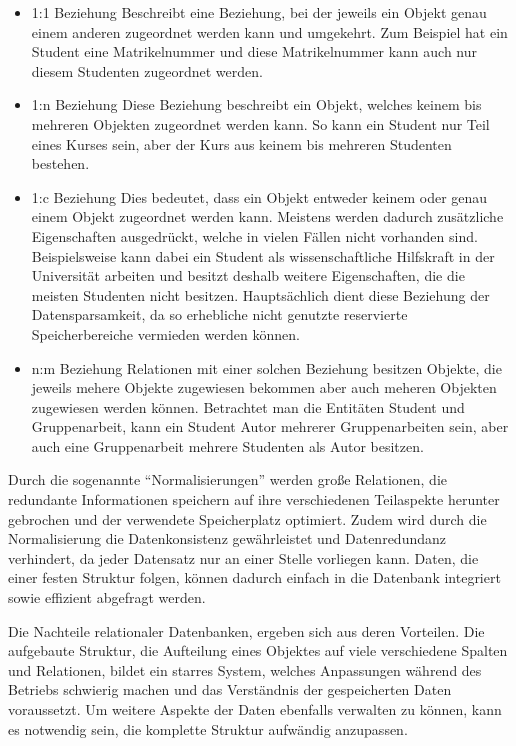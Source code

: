 \begin{itemize}
    \item 1:1 Beziehung \newline
    Beschreibt eine Beziehung, bei der jeweils ein Objekt genau einem anderen zugeordnet werden kann und umgekehrt.
    Zum Beispiel hat ein Student eine Matrikelnummer und diese Matrikelnummer kann auch nur diesem Studenten zugeordnet werden.
    \item 1:n Beziehung \newline
    Diese Beziehung beschreibt ein Objekt, welches keinem bis mehreren Objekten zugeordnet werden kann.
    So kann ein Student nur Teil eines Kurses sein, aber der Kurs aus keinem bis mehreren Studenten bestehen.
    \item 1:c Beziehung \newline
    Dies bedeutet, dass ein Objekt entweder keinem oder genau einem Objekt zugeordnet werden kann.
    Meistens werden dadurch zusätzliche Eigenschaften ausgedrückt, welche in vielen Fällen nicht vorhanden sind.
	Beispielsweise kann dabei ein Student als wissenschaftliche Hilfskraft in der Universität arbeiten und besitzt deshalb weitere Eigenschaften, die die meisten Studenten nicht besitzen.
	Hauptsächlich dient diese Beziehung der Datensparsamkeit, da so erhebliche nicht genutzte reservierte Speicherbereiche vermieden werden können.
    \item n:m Beziehung \newline
    Relationen mit einer solchen Beziehung besitzen Objekte, die jeweils mehere Objekte zugewiesen bekommen aber auch meheren Objekten zugewiesen werden können.
    Betrachtet man die Entitäten Student und Gruppenarbeit, kann ein Student Autor mehrerer Gruppenarbeiten sein, aber auch eine Gruppenarbeit mehrere Studenten als Autor besitzen.
\end{itemize}

Durch die sogenannte \enquote{Normalisierungen} werden große Relationen, die redundante Informationen speichern auf ihre verschiedenen Teilaspekte herunter gebrochen und der verwendete Speicherplatz optimiert.
Zudem wird durch die Normalisierung die Datenkonsistenz gewährleistet und Datenredundanz verhindert, da jeder Datensatz nur an einer Stelle vorliegen kann.
Daten, die einer festen Struktur folgen, können dadurch einfach in die Datenbank integriert sowie effizient abgefragt werden.

Die Nachteile relationaler Datenbanken, ergeben sich aus deren Vorteilen.
Die aufgebaute Struktur, die Aufteilung eines Objektes auf viele verschiedene Spalten und Relationen, bildet ein starres System, welches Anpassungen während des Betriebs schwierig machen und das Verständnis der gespeicherten Daten voraussetzt.
Um weitere Aspekte der Daten ebenfalls verwalten zu können, kann es notwendig sein, die komplette Struktur aufwändig anzupassen.
